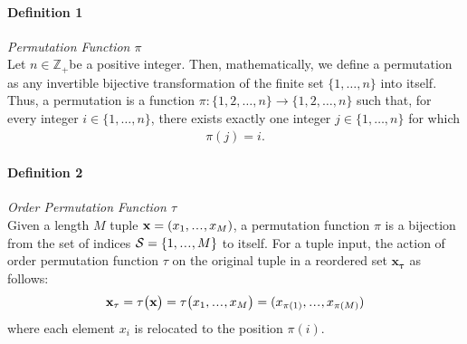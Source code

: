\documentclass{article}
\newcommand\sdots{\makebox[1em][c]{.\hfil.\hfil.}}
\begin{document}
\paragraph{Definition 1} \emph{Permutation Function $\pi$}\\
Let $n \in \mathbb{Z}_{+}$be a positive integer. Then, mathematically, we define a permutation as any invertible bijective transformation of the finite set $\{1, \ldots, n\}$ into itself.
Thus, a permutation is a function $\pi:\{1,2, \ldots, n\} \longrightarrow\{1,2, \ldots, n\}$ such that, 
for every integer $i \in\{1, \ldots, n\}$, there exists exactly one integer $j \in\{1, \ldots, n\}$ for which 
\begin{align}
\pi(j)=i.
\end{align}





\paragraph{Definition 2} \emph{Order Permutation Function $\tau$}\\
Given a length $M$ tuple $\mathbf{x} = (x_1, \sdots, x_M) $, a permutation function \(\pi\) is a bijection from the set of indices $\mathcal{S}=\{1, \sdots, M\}$ to itself.
For a tuple input, the action of order permutation function \(\tau\) on the original tuple in a reordered set $\mathbf{x_{\tau}}$  as follows:
\begin{align}
 \mathbf{x}_{\tau} = \tau\big(\mathbf{x} \big) = \tau\big( x_{1}, \sdots, x_{M} \big) = (x_{\pi(1)}, \sdots, x_{\pi(M)} )
\end{align}
where each element \( x_i \) is relocated to the position \( \pi(i) \).
\end{document}
